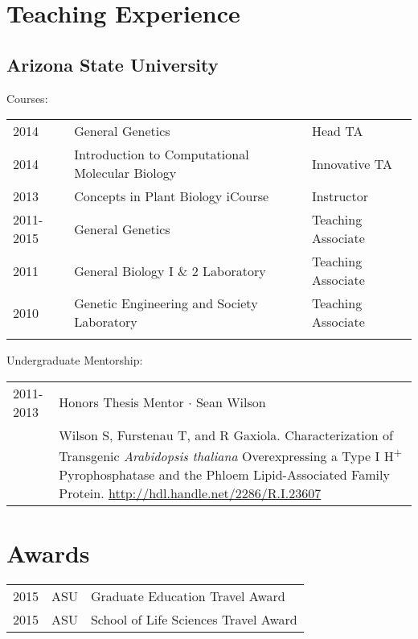 \documentclass[11pt]{article}
\begin{document}
\section*{Teaching Experience}
\subsection*{Arizona State University}
Courses:\\
\begin{tabularx}{\linewidth}{llX}
2014&General Genetics& Head TA\\
2014& Introduction to Computational Molecular Biology& Innovative TA\\
2013&Concepts in Plant Biology iCourse& Instructor\\
2011-2015&General Genetics&Teaching Associate\\
2011&General Biology I \& 2 Laboratory& Teaching Associate\\
2010&Genetic Engineering and Society Laboratory&Teaching Associate\\\\
\end{tabularx}
Undergraduate Mentorship:\\
\begin{tabularx}{\linewidth}{lX}
2011-2013&Honors Thesis Mentor $\cdotp$ Sean Wilson\\
&Wilson S, Furstenau T, and R Gaxiola. Characterization of Transgenic \textit{Arabidopsis thaliana} Overexpressing a Type I H\textsuperscript{+} Pyrophosphatase and the Phloem Lipid-Associated Family Protein. \href{http://hdl.handle.net/2286/R.I.23607}{http://hdl.handle.net/2286/R.I.23607}\\
\end{tabularx}


\section*{Awards}
\begin{tabularx}{\linewidth}{llX}
2015 & ASU &Graduate Education Travel Award\\
2015 & ASU &School of Life Sciences Travel Award\\
\end{tabularx}
\end{document}
